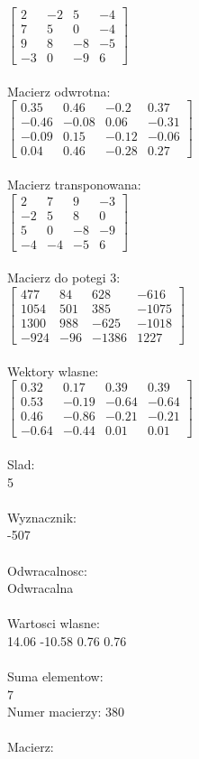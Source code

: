 \documentclass[a4paper,12pt]{article}
\begin{document}
$\begin{bmatrix} 2&-2&5&-4\\7&5&0&-4\\9&8&-8&-5\\-3&0&-9&6 \end{bmatrix}$
\\
\\
Macierz odwrotna:\\

$\begin{bmatrix} 0.35&0.46&-0.2&0.37\\-0.46&-0.08&0.06&-0.31\\-0.09&0.15&-0.12&-0.06\\0.04&0.46&-0.28&0.27 \end{bmatrix}$
\\
\\
Macierz transponowana:\\

$\begin{bmatrix} 2&7&9&-3\\-2&5&8&0\\5&0&-8&-9\\-4&-4&-5&6 \end{bmatrix}$
\\
\\
Macierz do potegi 3:\\

$\begin{bmatrix} 477&84&628&-616\\1054&501&385&-1075\\1300&988&-625&-1018\\-924&-96&-1386&1227 \end{bmatrix}$
\\
\\
Wektory wlasne:\\

$\begin{bmatrix} 0.32&0.17&0.39&0.39\\0.53&-0.19&-0.64&-0.64\\0.46&-0.86&-0.21&-0.21\\-0.64&-0.44&0.01&0.01 \end{bmatrix}$
\\
\\
Slad:\\
5
\\
\\
Wyznacznik:\\
-507
\\
\\
Odwracalnosc:\\
Odwracalna
\\
\\
Wartosci wlasne:\\
14.06 -10.58 0.76 0.76
\\
\\
Suma elementow:\\
7
\\
\newpage
Numer macierzy:
380
\\
\\
Macierz:\\
\end{document}
